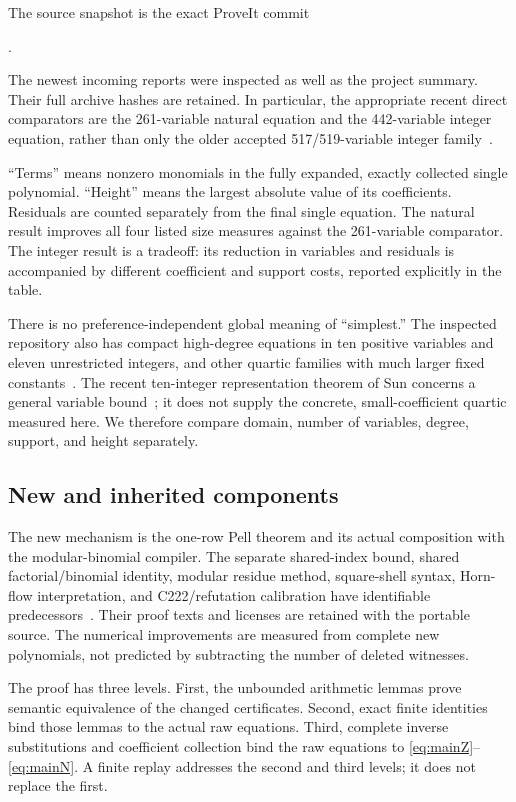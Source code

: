 \documentclass[11pt]{article}
\theoremstyle{remark}\newtheorem{remark}[theorem]{Remark}
\newcommand{\code}[1]{\texttt{\detokenize{#1}}}
\begin{document}
The source snapshot is the exact ProveIt commit
\begin{center}\small\code{f4d8db99e060339f3306a04d507c35bc1d0d68c5}.\end{center}
The newest incoming reports were inspected as well as the project summary. Their full archive hashes are retained. In particular, the appropriate recent direct comparators are the 261-variable natural equation and the 442-variable integer equation, rather than only the older accepted 517/519-variable integer family~\cite{cap261,round15,repo}.



``Terms'' means nonzero monomials in the fully expanded, exactly collected single polynomial. ``Height'' means the largest absolute value of its coefficients. Residuals are counted separately from the final single equation. The natural result improves all four listed size measures against the 261-variable comparator. The integer result is a tradeoff: its reduction in variables and residuals is accompanied by different coefficient and support costs, reported explicitly in the table.

There is no preference-independent global meaning of ``simplest.'' The inspected repository also has compact high-degree equations in ten positive variables and eleven unrestricted integers, and other quartic families with much larger fixed constants~\cite{repo}. The recent ten-integer representation theorem of Sun concerns a general variable bound~\cite{sun10}; it does not supply the concrete, small-coefficient quartic measured here. We therefore compare domain, number of variables, degree, support, and height separately.

\subsection{New and inherited components}

The new mechanism is the one-row Pell theorem and its actual composition with the modular-binomial compiler. The separate shared-index bound, shared factorial/binomial identity, modular residue method, square-shell syntax, Horn-flow interpretation, and C222/refutation calibration have identifiable predecessors~\cite{cap261,shared319,shell}. Their proof texts and licenses are retained with the portable source. The numerical improvements are measured from complete new polynomials, not predicted by subtracting the number of deleted witnesses.

The proof has three levels. First, the unbounded arithmetic lemmas prove semantic equivalence of the changed certificates. Second, exact finite identities bind those lemmas to the actual raw equations. Third, complete inverse substitutions and coefficient collection bind the raw equations to \eqref{eq:mainZ}--\eqref{eq:mainN}. A finite replay addresses the second and third levels; it does not replace the first.
\end{document}
